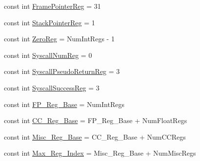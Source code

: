 \begin{DoxyCompactItemize}
\item 
const int \hyperlink{namespacePowerISA_aabd6fa5889c9ccc124dfd4a984046f6f}{FramePointerReg} = 31
\item 
const int \hyperlink{namespacePowerISA_a95d0846360ad0e64cb42fda7268a6434}{StackPointerReg} = 1
\item 
const int \hyperlink{namespacePowerISA_a33dbba4a12f6733a5ecc2d2b3542b7ee}{ZeroReg} = NumIntRegs -\/ 1
\item 
const int \hyperlink{namespacePowerISA_ab258e2663398d45bb2996ff71313c4db}{SyscallNumReg} = 0
\item 
const int \hyperlink{namespacePowerISA_ab566b6da98edbb32e80291edaf0906ba}{SyscallPseudoReturnReg} = 3
\item 
const int \hyperlink{namespacePowerISA_a5b14981f767959a404638f100f655dfd}{SyscallSuccessReg} = 3
\item 
const int \hyperlink{namespacePowerISA_a833d6deee31e8a9398618efdc22effde}{FP\_\-Reg\_\-Base} = NumIntRegs
\item 
const int \hyperlink{namespacePowerISA_ab1d4916ec3ee18e808b3452603742d38}{CC\_\-Reg\_\-Base} = FP\_\-Reg\_\-Base + NumFloatRegs
\item 
const int \hyperlink{namespacePowerISA_a0ff03b99f2760c682de4e9cb0a3cd8a1}{Misc\_\-Reg\_\-Base} = CC\_\-Reg\_\-Base + NumCCRegs
\item 
const int \hyperlink{namespacePowerISA_a436c085ed5c04b95a1c0cbcc728c39d4}{Max\_\-Reg\_\-Index} = Misc\_\-Reg\_\-Base + NumMiscRegs
\end{DoxyCompactItemize}
